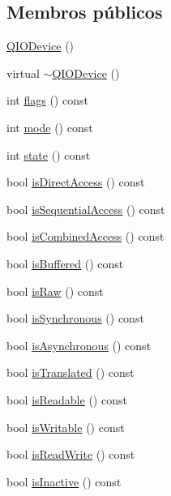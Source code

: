 \subsection*{Membros públicos}
\begin{DoxyCompactItemize}
\item 
\hyperlink{class_q_i_o_device_a9856548cc04dff1795a43a4053b45944}{Q\-I\-O\-Device} ()
\item 
virtual \hyperlink{class_q_i_o_device_ae8e1ce02bac1a6585a8652c86f238385}{$\sim$\-Q\-I\-O\-Device} ()
\item 
int \hyperlink{class_q_i_o_device_a5f944e30665d7e6775691e5fc63e9dc7}{flags} () const 
\item 
int \hyperlink{class_q_i_o_device_a649d73845b061693fc34041ba743191c}{mode} () const 
\item 
int \hyperlink{class_q_i_o_device_aefe1a1411bb99d7f4ef75e5f869d93c2}{state} () const 
\item 
bool \hyperlink{class_q_i_o_device_af204d77ff61fe64f8307895683537d0f}{is\-Direct\-Access} () const 
\item 
bool \hyperlink{class_q_i_o_device_a341a1db499fc669a8d6d928e4ed562c4}{is\-Sequential\-Access} () const 
\item 
bool \hyperlink{class_q_i_o_device_adc932f3d7bdf67d00eb8c16f794c18cb}{is\-Combined\-Access} () const 
\item 
bool \hyperlink{class_q_i_o_device_a461a2120c073ee7296f36e056965e814}{is\-Buffered} () const 
\item 
bool \hyperlink{class_q_i_o_device_ac85d64e1707ab9703cbc294172cf433d}{is\-Raw} () const 
\item 
bool \hyperlink{class_q_i_o_device_a23a0e1a575c081f62ce78763c32ed5d1}{is\-Synchronous} () const 
\item 
bool \hyperlink{class_q_i_o_device_ad39f562822866117fb02b85e3251f4bb}{is\-Asynchronous} () const 
\item 
bool \hyperlink{class_q_i_o_device_aa32090c7e1cc3f13f7eb1d419674f0bc}{is\-Translated} () const 
\item 
bool \hyperlink{class_q_i_o_device_a3d7f091ba732d3899bcb34dde9fbfd63}{is\-Readable} () const 
\item 
bool \hyperlink{class_q_i_o_device_aa741717fa726eea03300fdde9934808a}{is\-Writable} () const 
\item 
bool \hyperlink{class_q_i_o_device_aa05746eae63aee1fb4758c13d0301a9f}{is\-Read\-Write} () const 
\item 
bool \hyperlink{class_q_i_o_device_a44b7e3231fdb2ff6ee1fb822b2b921eb}{is\-Inactive} () const 

\end{DoxyCompactItemize}
